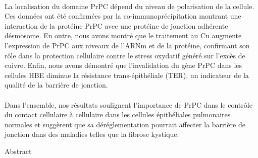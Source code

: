 \\
La localisation du domaine PrPC dépend du niveau de polarisation de la cellule. Ces données ont été confirmées par la co-immunoprécipitation montrant une interaction de la protéine PrPC avec une protéine de jonction adhérente désmosome. En outre, nous avons montré que le traitement au Cu augmente l'expression de PrPC aux niveaux de l'ARNm et de la protéine, confirmant son rôle dans la protection cellulaire contre le stress oxydatif généré sur l'excès de cuivre. Enfin, nous avons démontré que l'invalidation du gène PrPC dans les cellules HBE diminue la résistance trans-épithéliale (TER), un indicateur de la qualité de la barrière de jonction.\\
\\
Dans l'ensemble, nos résultats soulignent l'importance de PrPC dans le contrôle du contact cellulaire à cellulaire dans les cellules épithéliales pulmonaires normales et suggèrent que sa déréglementation pourrait affecter la barrière de jonction dans des maladies telles que la fibrose kystique.

\vspace*{20mm}

\renewcommand{\abstractname}{Abstract}
{\abstractname}\label{sec:abstract-diff} \\

